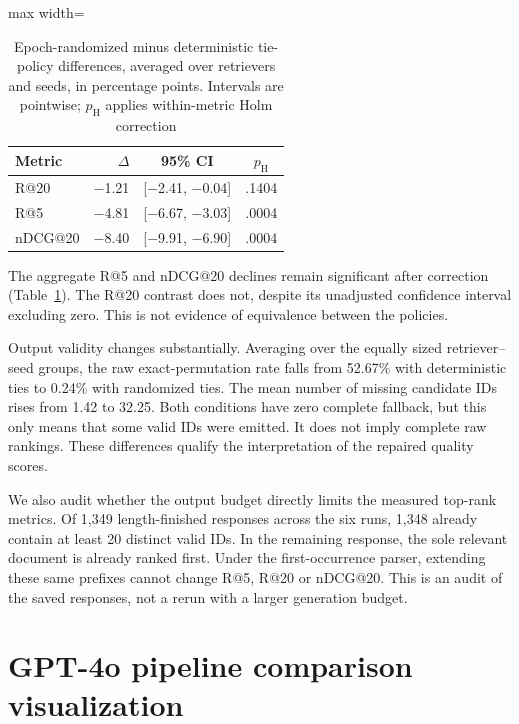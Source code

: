 \documentclass[pdflatex,sn-basic,Numbered]{sn-jnl}%
\theoremstyle{thmstyleone}%
\theoremstyle{thmstyletwo}%
\theoremstyle{thmstylethree}%
\begin{document}
\begin{table}[ht]


\centering
\scriptsize
\setlength{\tabcolsep}{3pt}
\renewcommand{\arraystretch}{1.08}
\begin{adjustbox}{max width=\linewidth}
\begin{tabular}{l r c c}
\hline
Metric & $\Delta$ & 95\% CI & $p_{\mathrm{H}}$ \\
\hline
R@20 & $-$1.21 & [$-$2.41, $-$0.04] & .1404 \\
R@5 & $-$4.81 & [$-$6.67, $-$3.03] & .0004 \\
nDCG@20 & $-$8.40 & [$-$9.91, $-$6.90] & .0004 \\
\hline
\end{tabular}
\end{adjustbox}


\caption{Epoch-randomized minus deterministic tie-policy differences, averaged over retrievers and seeds, in percentage points. Intervals are pointwise; $p_{\mathrm{H}}$ applies within-metric Holm correction}
\label{tab:tie-sensitivity-uncertainty}
\end{table}

The aggregate R@5 and nDCG@20 declines remain significant after correction
(Table~\ref{tab:tie-sensitivity-uncertainty}). The R@20 contrast does not,
despite its unadjusted confidence interval excluding zero. This is not evidence
of equivalence between the policies.

Output validity changes substantially. Averaging over the equally sized
retriever--seed groups, the raw exact-permutation rate falls from 52.67\% with
deterministic ties to 0.24\% with randomized ties. The mean number of missing
candidate IDs rises from 1.42 to 32.25. Both conditions have zero complete
fallback, but this only means that some valid IDs were emitted. It does not
imply complete raw rankings. These differences qualify the interpretation of
the repaired quality scores.

We also audit whether the output budget directly limits the measured top-rank
metrics. Of 1,349 length-finished responses across the six runs, 1,348 already
contain at least 20 distinct valid IDs. In the remaining response, the sole
relevant document is already ranked first. Under the first-occurrence parser,
extending these same prefixes cannot change R@5, R@20 or nDCG@20. This is an
audit of the saved responses, not a rerun with a larger generation budget.

\FloatBarrier
\section{GPT-4o pipeline comparison visualization}
\label{supp:gpt4o-figure}
\end{document}
